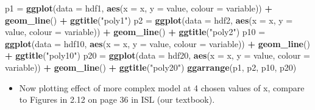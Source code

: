 \documentclass[]{article}
\newenvironment{Shaded}{\begin{snugshade}}{\end{snugshade}}
\newcommand{\KeywordTok}[1]{\textcolor[rgb]{0.13,0.29,0.53}{\textbf{#1}}}
\newcommand{\DataTypeTok}[1]{\textcolor[rgb]{0.13,0.29,0.53}{#1}}
\newcommand{\StringTok}[1]{\textcolor[rgb]{0.31,0.60,0.02}{#1}}
\newcommand{\OperatorTok}[1]{\textcolor[rgb]{0.81,0.36,0.00}{\textbf{#1}}}
\newcommand{\NormalTok}[1]{#1}
\providecommand{\tightlist}{%
  \setlength{\itemsep}{0pt}\setlength{\parskip}{0pt}}
\begin{document}
\begin{Shaded}
\begin{Highlighting}[]
\NormalTok{p1 =}\StringTok{ }\KeywordTok{ggplot}\NormalTok{(}\DataTypeTok{data =}\NormalTok{ hdf1, }\KeywordTok{aes}\NormalTok{(}\DataTypeTok{x =}\NormalTok{ x, }\DataTypeTok{y =}\NormalTok{ value, }\DataTypeTok{colour =}\NormalTok{ variable)) }\OperatorTok{+}\StringTok{ }
\StringTok{    }\KeywordTok{geom_line}\NormalTok{() }\OperatorTok{+}\StringTok{ }\KeywordTok{ggtitle}\NormalTok{(}\StringTok{"poly1"}\NormalTok{)}
\NormalTok{p2 =}\StringTok{ }\KeywordTok{ggplot}\NormalTok{(}\DataTypeTok{data =}\NormalTok{ hdf2, }\KeywordTok{aes}\NormalTok{(}\DataTypeTok{x =}\NormalTok{ x, }\DataTypeTok{y =}\NormalTok{ value, }\DataTypeTok{colour =}\NormalTok{ variable)) }\OperatorTok{+}\StringTok{ }
\StringTok{    }\KeywordTok{geom_line}\NormalTok{() }\OperatorTok{+}\StringTok{ }\KeywordTok{ggtitle}\NormalTok{(}\StringTok{"poly2"}\NormalTok{)}
\NormalTok{p10 =}\StringTok{ }\KeywordTok{ggplot}\NormalTok{(}\DataTypeTok{data =}\NormalTok{ hdf10, }\KeywordTok{aes}\NormalTok{(}\DataTypeTok{x =}\NormalTok{ x, }\DataTypeTok{y =}\NormalTok{ value, }\DataTypeTok{colour =}\NormalTok{ variable)) }\OperatorTok{+}\StringTok{ }
\StringTok{    }\KeywordTok{geom_line}\NormalTok{() }\OperatorTok{+}\StringTok{ }\KeywordTok{ggtitle}\NormalTok{(}\StringTok{"poly10"}\NormalTok{)}
\NormalTok{p20 =}\StringTok{ }\KeywordTok{ggplot}\NormalTok{(}\DataTypeTok{data =}\NormalTok{ hdf20, }\KeywordTok{aes}\NormalTok{(}\DataTypeTok{x =}\NormalTok{ x, }\DataTypeTok{y =}\NormalTok{ value, }\DataTypeTok{colour =}\NormalTok{ variable)) }\OperatorTok{+}\StringTok{ }
\StringTok{    }\KeywordTok{geom_line}\NormalTok{() }\OperatorTok{+}\StringTok{ }\KeywordTok{ggtitle}\NormalTok{(}\StringTok{"poly20"}\NormalTok{)}
\KeywordTok{ggarrange}\NormalTok{(p1, p2, p10, p20)}
\end{Highlighting}
\end{Shaded}

\begin{itemize}
\tightlist
\item
  Now plotting effect of more complex model at 4 chosen values of x,
  compare to Figures in 2.12 on page 36 in ISL (our textbook).
\end{itemize}
\end{document}
